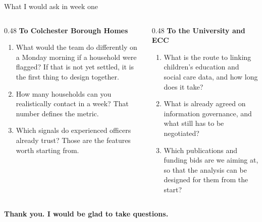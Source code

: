 \documentclass[aspectratio=169,11pt]{beamer}
\newcommand{\lead}[1]{{\color{seriesone}\bfseries #1}}
\begin{document}
\begin{frame}{What I would ask in week one}
  \begin{columns}[T,onlytextwidth]
    \begin{column}{0.48\textwidth}
      \lead{To Colchester Borough Homes}
      \begin{enumerate}\footnotesize
        \item What would the team do differently on a Monday morning if a
              household were flagged? If that is not yet settled, it is the
              first thing to design together.
        \item How many households can you realistically contact in a week?
              That number defines the metric.
        \item Which signals do experienced officers already trust? Those are
              the features worth starting from.
      \end{enumerate}
    \end{column}
    \begin{column}{0.48\textwidth}
      \lead{To the University and ECC}
      \begin{enumerate}\footnotesize
        \item What is the route to linking children's education and social
              care data, and how long does it take?
        \item What is already agreed on information governance, and what still
              has to be negotiated?
        \item Which publications and funding bids are we aiming at, so that
              the analysis can be designed for them from the start?
      \end{enumerate}
    \end{column}
  \end{columns}
  \vspace{4mm}
  \begin{center}
    \large\color{seriesone}\bfseries
    Thank you. I would be glad to take questions.
  \end{center}
\end{frame}

\appendix
\end{document}
